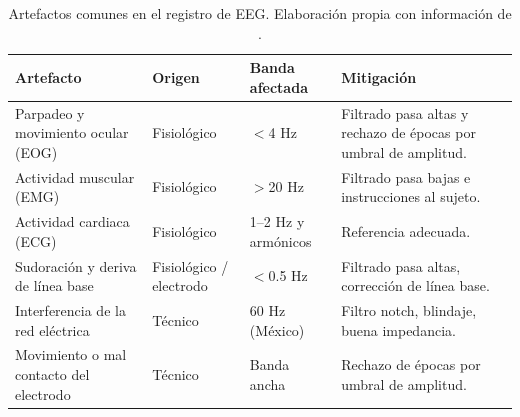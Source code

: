 \begin{table}[htbp]
\centering
\small
\begin{tabularx}{\textwidth}{|L{2.8cm}|L{2.3cm}|L{2.4cm}|Y|}
\hline
\textbf{Artefacto} & \textbf{Origen} & \textbf{Banda afectada} & \textbf{Mitigación} \\ \hline
Parpadeo y movimiento ocular (EOG) & Fisiológico & $<$4 Hz & Filtrado pasa altas y rechazo de épocas por umbral de amplitud. \\ \hline
Actividad muscular (EMG) & Fisiológico & $>$20 Hz & Filtrado pasa bajas e instrucciones al sujeto. \\ \hline
Actividad cardiaca (ECG) & Fisiológico & 1--2 Hz y armónicos & Referencia adecuada. \\ \hline
Sudoración y deriva de línea base & Fisiológico / electrodo & $<$0.5 Hz & Filtrado pasa altas, corrección de línea base. \\ \hline
Interferencia de la red eléctrica & Técnico & 60 Hz (México) & Filtro notch, blindaje, buena impedancia. \\ \hline
Movimiento o mal contacto del electrodo & Técnico & Banda ancha & Rechazo de épocas por umbral de amplitud. \\ \hline
\end{tabularx}
\caption{Artefactos comunes en el registro de EEG. Elaboración propia con información de \cite{sanei2007,niedermeyer2005}.}
\label{tab:artefactos}
\end{table}
